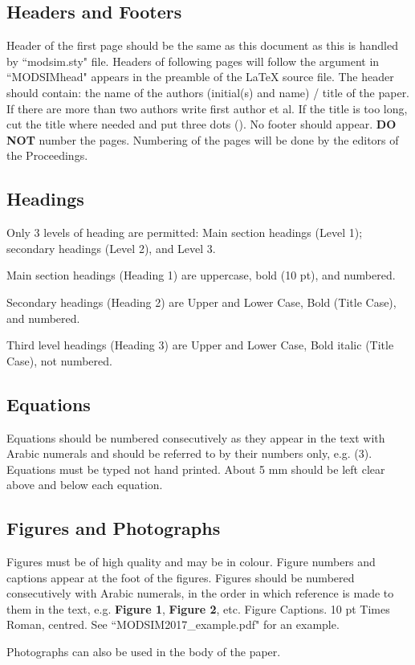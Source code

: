 \documentclass[a4paper,fleqn]{article} %
\begin{document}
\subsection{Headers and Footers}
Header of the first page should be the same as this document as this is handled by ``modsim.sty" file. Headers of following pages will follow the argument in ``MODSIMhead" appears in the preamble of the \LaTeX{} source file. The header should contain: the name of the authors (initial(s) and name) / title of the paper. If there are more than two authors write first author et al. If the title is too long, cut the title where needed and put three dots (). No footer should appear. \textbf{DO NOT} number the pages. Numbering of the pages will be done by the editors of the Proceedings.

\subsection{Headings}
Only 3 levels of heading are permitted: Main section headings (Level 1); secondary headings (Level 2), and Level 3. \par
Main section headings (Heading 1) are uppercase, bold (10 pt), and numbered.\par
Secondary headings (Heading 2) are Upper and Lower Case, Bold (Title Case), and numbered. \par
Third level headings (Heading 3) are Upper and Lower Case, Bold italic (Title Case), not numbered. \par

\subsection{Equations}
Equations should be numbered consecutively as they appear in the text with Arabic numerals and should be referred to by their numbers only, e.g. (3).  Equations must be typed not hand printed.  About 5 mm should be left clear above and below each equation.

\subsection{Figures and Photographs}
Figures must be of high quality and may be in colour. Figure numbers and captions appear at the foot of the figures. Figures should be numbered consecutively with Arabic numerals, in the order in which reference is made to them in the text, e.g. {\bfseries Figure 1}, {\bfseries Figure 2}, etc. Figure Captions. 10 pt Times Roman, centred. See ``MODSIM2017\_example.pdf" for an example.  \par
\noindent Photographs can also be used in the body of the paper. \par
\end{document}
